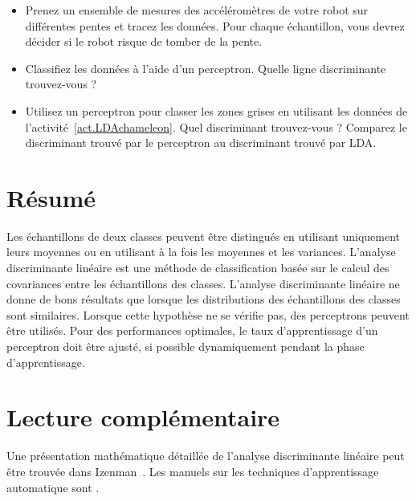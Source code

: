 \begin{framed}
\begin{itemize}
\item Prenez un ensemble de mesures des accéléromètres de votre robot sur différentes pentes et tracez les données. Pour chaque échantillon, vous devrez décider si le robot risque de tomber de la pente.
\item Classifiez les données à l'aide d'un perceptron. Quelle ligne discriminante trouvez-vous ?
\item Utilisez un perceptron pour classer les zones grises en utilisant les données de l'activité~\ref{act.LDAchameleon}. Quel discriminant trouvez-vous ? Comparez le discriminant trouvé par le perceptron au discriminant trouvé par LDA.
\end{itemize}
\end{framed}

\section{Résumé}

Les échantillons de deux classes peuvent être distingués en utilisant uniquement leurs moyennes ou en utilisant à la fois les moyennes et les variances. L'analyse discriminante linéaire est une méthode de classification basée sur le calcul des covariances entre les échantillons des classes. L'analyse discriminante linéaire ne donne de bons résultats que lorsque les distributions des échantillons des classes sont similaires. Lorsque cette hypothèse ne se vérifie pas, des perceptrons peuvent être utilisés. Pour des performances optimales, le taux d'apprentissage d'un perceptron doit être ajusté, si possible dynamiquement pendant la phase d'apprentissage.

\section{Lecture complémentaire}

Une présentation mathématique détaillée de l'analyse discriminante linéaire peut être trouvée dans Izenman~\cite[Chapitre~8]{izenman2008}. Les manuels sur les techniques d'apprentissage automatique sont \cite{harrington2012machine, kubat2015machinelearning}.
